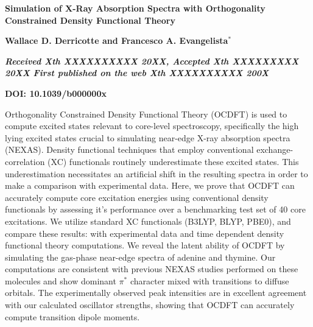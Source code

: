 \documentclass[12pt]{article}
\begin{document}
\noindent\LARGE{\textbf{Simulation of X-Ray Absorption Spectra with Orthogonality Constrained Density Functional Theory
}} 
\vspace{0.6cm}

\noindent\large{\textbf{Wallace D. Derricotte and Francesco A. Evangelista$^{\ast}$}}\vspace{0.5cm}


\noindent\textit{\small{\textbf{Received Xth XXXXXXXXXX 20XX, Accepted Xth XXXXXXXXX 20XX\newline
First published on the web Xth XXXXXXXXXX 200X}}}

\noindent \textbf{\small{DOI: 10.1039/b000000x}}
\vspace{0.6cm}

\noindent \normalsize{Orthogonality Constrained Density Functional Theory (OCDFT) is used to compute excited states relevant to core-level spectroscopy, specifically the high lying excited states crucial to simulating near-edge X-ray absorption spectra (NEXAS). Density functional techniques that employ conventional exchange-correlation (XC) functionals routinely underestimate these excited states. This underestimation necessitates an artificial shift in the resulting spectra in order to make a comparison with experimental data. Here, we prove that OCDFT can accurately compute core excitation energies using conventional density functionals by assessing it's performance over a benchmarking test set of 40 core excitations. We utilize standard XC functionals (B3LYP, BLYP, PBE0), and compare these results: with experimental data and time dependent density functional theory computations. We reveal the latent ability of OCDFT by simulating the gas-phase near-edge spectra of adenine and thymine. Our computations are consistent with previous NEXAS studies performed on these molecules and show dominant $\pi^*$ character mixed with transitions to diffuse orbitals. The experimentally observed peak intensities are in excellent agreement with our calculated oscillator strengths, showing that OCDFT can accurately compute transition dipole moments.}
\vspace{0.5cm}
\doublespacing
\end{document}
